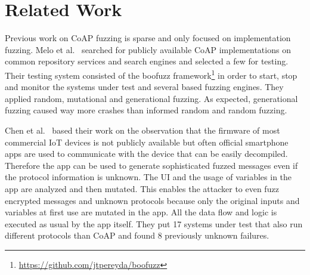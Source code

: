 \section{Related Work}
\label{section:related_work}


Previous work on CoAP fuzzing is sparse and only focused on implementation fuzzing. Melo et al.~\cite{Melo2017RobustnessTO} searched for publicly available CoAP implementations on common repository services and search engines and selected a few for testing. Their testing system consisted of the boofuzz framework\footnote{\url{https://github.com/jtpereyda/boofuzz}} in order to start, stop and monitor the systems under test and several \scapy based fuzzing engines. They applied random, mutational and generational fuzzing. As expected, generational fuzzing caused way more crashes than informed random and random fuzzing.

Chen et al.~\cite{chen2018ndss} based their work on the observation that the firmware of most commercial IoT devices is not publicly available but often official smartphone apps are used to communicate with the device that can be easily decompiled. Therefore the app can be used to generate sophisticated fuzzed messages even if the protocol information is unknown. The UI and the usage of variables in the app are analyzed and then mutated. This enables the attacker to even fuzz encrypted messages and unknown protocols because only the original inputs and variables at first use are mutated in the app. All the data flow and logic is executed as usual by the app itself.  They put 17 systems under test that also run different protocols than CoAP and found 8 previously unknown failures.

